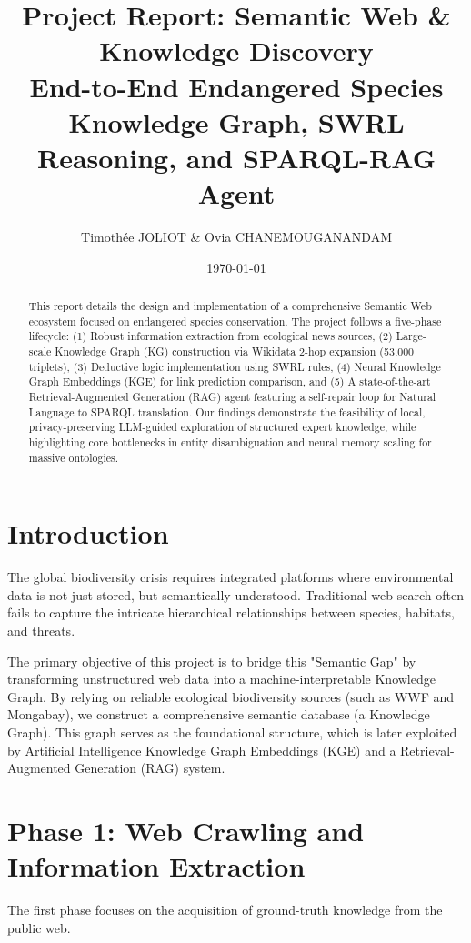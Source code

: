 \documentclass[11pt]{article}
\title{\textbf{Project Report: Semantic Web \& Knowledge Discovery}\\ \large End-to-End Endangered Species Knowledge Graph, SWRL Reasoning, and SPARQL-RAG Agent}
\author{Timothée JOLIOT \& Ovia CHANEMOUGANANDAM}
\date{\today}
\begin{document}
\maketitle

\begin{abstract}
This report details the design and implementation of a comprehensive Semantic Web ecosystem focused on endangered species conservation. The project follows a five-phase lifecycle: (1) Robust information extraction from ecological news sources, (2) Large-scale Knowledge Graph (KG) construction via Wikidata 2-hop expansion (53,000 triplets), (3) Deductive logic implementation using SWRL rules, (4) Neural Knowledge Graph Embeddings (KGE) for link prediction comparison, and (5) A state-of-the-art Retrieval-Augmented Generation (RAG) agent featuring a self-repair loop for Natural Language to SPARQL translation. Our findings demonstrate the feasibility of local, privacy-preserving LLM-guided exploration of structured expert knowledge, while highlighting core bottlenecks in entity disambiguation and neural memory scaling for massive ontologies.
\end{abstract}

\tableofcontents
\newpage

\section{Introduction}
The global biodiversity crisis requires integrated platforms where environmental data is not just stored, but semantically understood. Traditional web search often fails to capture the intricate hierarchical relationships between species, habitats, and threats. 

The primary objective of this project is to bridge this "Semantic Gap" by transforming unstructured web data into a machine-interpretable Knowledge Graph. By relying on reliable ecological biodiversity sources (such as WWF and Mongabay), we construct a comprehensive semantic database (a Knowledge Graph). This graph serves as the foundational structure, which is later exploited by Artificial Intelligence Knowledge Graph Embeddings (KGE) and a Retrieval-Augmented Generation (RAG) system.

\section{Phase 1: Web Crawling and Information Extraction}
The first phase focuses on the acquisition of ground-truth knowledge from the public web.
\end{document}

